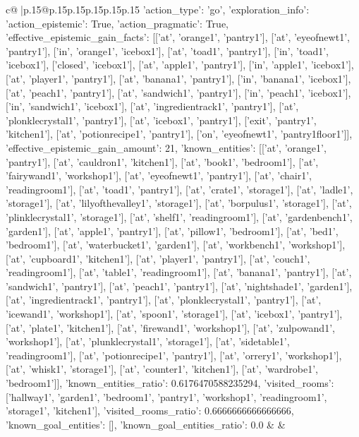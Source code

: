 \documentclass{article}
\begin{document}
{\begin{supertabular}{c@{$\;$}|p{.15\linewidth}@{}p{.15\linewidth}p{.15\linewidth}p{.15\linewidth}p{.15\linewidth}p{.15\linewidth}}
{{{	 {'action_type': 'go', 'exploration_info': {'action_epistemic': True, 'action_pragmatic': True, 'effective_epistemic_gain_facts': [['at', 'orange1', 'pantry1'], ['at', 'eyeofnewt1', 'pantry1'], ['in', 'orange1', 'icebox1'], ['at', 'toad1', 'pantry1'], ['in', 'toad1', 'icebox1'], ['closed', 'icebox1'], ['at', 'apple1', 'pantry1'], ['in', 'apple1', 'icebox1'], ['at', 'player1', 'pantry1'], ['at', 'banana1', 'pantry1'], ['in', 'banana1', 'icebox1'], ['at', 'peach1', 'pantry1'], ['at', 'sandwich1', 'pantry1'], ['in', 'peach1', 'icebox1'], ['in', 'sandwich1', 'icebox1'], ['at', 'ingredientrack1', 'pantry1'], ['at', 'plonklecrystal1', 'pantry1'], ['at', 'icebox1', 'pantry1'], ['exit', 'pantry1', 'kitchen1'], ['at', 'potionrecipe1', 'pantry1'], ['on', 'eyeofnewt1', 'pantry1floor1']], 'effective_epistemic_gain_amount': 21, 'known_entities': [['at', 'orange1', 'pantry1'], ['at', 'cauldron1', 'kitchen1'], ['at', 'book1', 'bedroom1'], ['at', 'fairywand1', 'workshop1'], ['at', 'eyeofnewt1', 'pantry1'], ['at', 'chair1', 'readingroom1'], ['at', 'toad1', 'pantry1'], ['at', 'crate1', 'storage1'], ['at', 'ladle1', 'storage1'], ['at', 'lilyofthevalley1', 'storage1'], ['at', 'borpulus1', 'storage1'], ['at', 'plinklecrystal1', 'storage1'], ['at', 'shelf1', 'readingroom1'], ['at', 'gardenbench1', 'garden1'], ['at', 'apple1', 'pantry1'], ['at', 'pillow1', 'bedroom1'], ['at', 'bed1', 'bedroom1'], ['at', 'waterbucket1', 'garden1'], ['at', 'workbench1', 'workshop1'], ['at', 'cupboard1', 'kitchen1'], ['at', 'player1', 'pantry1'], ['at', 'couch1', 'readingroom1'], ['at', 'table1', 'readingroom1'], ['at', 'banana1', 'pantry1'], ['at', 'sandwich1', 'pantry1'], ['at', 'peach1', 'pantry1'], ['at', 'nightshade1', 'garden1'], ['at', 'ingredientrack1', 'pantry1'], ['at', 'plonklecrystal1', 'pantry1'], ['at', 'icewand1', 'workshop1'], ['at', 'spoon1', 'storage1'], ['at', 'icebox1', 'pantry1'], ['at', 'plate1', 'kitchen1'], ['at', 'firewand1', 'workshop1'], ['at', 'zulpowand1', 'workshop1'], ['at', 'plunklecrystal1', 'storage1'], ['at', 'sidetable1', 'readingroom1'], ['at', 'potionrecipe1', 'pantry1'], ['at', 'orrery1', 'workshop1'], ['at', 'whisk1', 'storage1'], ['at', 'counter1', 'kitchen1'], ['at', 'wardrobe1', 'bedroom1']], 'known_entities_ratio': 0.6176470588235294, 'visited_rooms': ['hallway1', 'garden1', 'bedroom1', 'pantry1', 'workshop1', 'readingroom1', 'storage1', 'kitchen1'], 'visited_rooms_ratio': 0.6666666666666666, 'known_goal_entities': [], 'known_goal_entities_ratio': 0.0}} 
	  } 
	   } 
	   } 
	 & & \\ 
 


\end{supertabular}}
\end{document}
